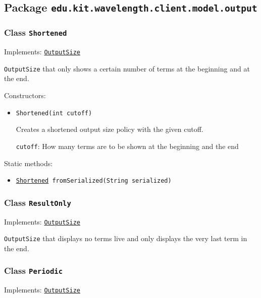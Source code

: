 \subsection{Package \lstinline{edu.kit.wavelength.client.model.output}}
\label{pkg:edu.kit.wavelength.client.model.output}


\subsubsection{Class \texttt{Shortened}}
\label{type:edu.kit.wavelength.client.model.output.Shortened}
Implements: \texttt{\hyperref[type:edu.kit.wavelength.client.model.output.OutputSize]{OutputSize}}

\texttt{OutputSize} that only shows a certain number of terms at the beginning
 and at the end.

Constructors:
\begin{itemize}
\item \texttt{Shortened(int cutoff)}

Creates a shortened output size policy with the given cutoff.

\texttt{cutoff}: How many terms are to be shown at the beginning and the end

\end{itemize}

Static methods:
\begin{itemize}
\item \texttt{\hyperref[type:edu.kit.wavelength.client.model.output.Shortened]{Shortened} fromSerialized(String serialized)}



\end{itemize}

\subsubsection{Class \texttt{ResultOnly}}
\label{type:edu.kit.wavelength.client.model.output.ResultOnly}
Implements: \texttt{\hyperref[type:edu.kit.wavelength.client.model.output.OutputSize]{OutputSize}}

\texttt{OutputSize} that displays no terms live and
 only displays the very last term in the end.

\subsubsection{Class \texttt{Periodic}}
\label{type:edu.kit.wavelength.client.model.output.Periodic}
Implements: \texttt{\hyperref[type:edu.kit.wavelength.client.model.output.OutputSize]{OutputSize}}

